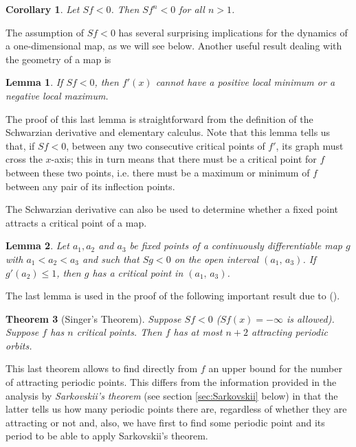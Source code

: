 \documentclass[10pt,twoside,titlepage]{book}
\numberwithin{equation}{chapter}
\numberwithin{figure}{chapter}
\numberwithin{table}{chapter}
\theoremstyle{plain}%
\newtheorem{thm}{Theorem}[chapter]
\newtheorem{lem}[thm]{Lemma}
\newtheorem*{cor}{Corollary}
\theoremstyle{definition}
\theoremstyle{remark}
\begin{document}
\begin{cor}
	Let $Sf<0$. Then $Sf^{n}<0$ for all $n>1$.
\end{cor}

The assumption of $Sf<0$ has several surprising implications for the dynamics of a one-dimensional map, as we will see below. Another useful result dealing with the geometry of a map is

\begin{lem}
	\label{lem:maxmin}
	If $Sf<0$, then $f'(x)$ cannot have a positive local minimum or a negative local maximum.
\end{lem}

The proof of this last lemma is straightforward from the definition of the Schwarzian derivative and elementary calculus. Note that this lemma tells us that, if $Sf<0$, between any two consecutive critical points of $f'$, its graph must cross the $x$-axis; this in turn means that there must be a critical point for $f$ between these two points, i.e. there must be a maximum or minimum of $f$ between any pair of its inflection points.

The Schwarzian derivative can also be used to determine whether a fixed point attracts a critical point of a map.

\begin{lem}
	Let $a_1, a_2$ and $a_3$ be fixed points of a continuously differentiable map $g$ with $a_1<a_2<a_3$ and such that $Sg<0$ on the open interval $(a_1,\,a_3)$. If $g'(a_2)\leq 1$, then $g$ has a critical point in $(a_1,\,a_3)$.
\end{lem}

The last lemma is used in the proof of the following important result due to \cite{Singer} (\cite{Singer}).

\begin{thm}[Singer's Theorem]
	\label{thm:Singer}
	Suppose $Sf<0$ ($Sf(x)=-\infty$ is allowed). Suppose $f$ has $n$ critical points. Then $f$ has at most $n+2$ attracting periodic orbits.
\end{thm}

This last theorem allows to find directly from $f$ an upper bound for the number of attracting periodic points. This differs from the information provided in the analysis by \emph{Sarkovskii's theorem} (see section \ref{sec:Sarkovskii} below) in that the latter tells us how many periodic points there are, regardless of whether they are attracting or not and, also, we have first to find some periodic point and its period to be able to apply Sarkovskii's theorem.
\end{document}
